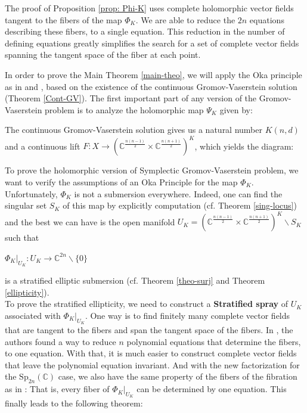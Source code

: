 \documentclass[10pt]{amsart}
\newtheorem{theo}{Theorem}[section]
\theoremstyle{remark}
\begin{document}
The proof of Proposition \ref{prop: Phi-K} uses complete holomorphic vector fields tangent to the fibers of the map $\Phi_K$. We are able to reduce the $2n$ equations describing these fibers, to a single equation. This reduction in the number of defining equations greatly simplifies the search for a set of complete vector fields spanning the tangent space of the fiber at each point. 

\iffalse
In order to prove the Main Theorem \ref{main-theo}, we will apply the Oka principle as in \cite{KI} and \cite{Scho}, based on the existence of the continuous Gromov-Vaserstein solution (Theorem \ref{Cont-GV}). The first important part of any version of the Gromov-Vaserstein problem is to analyze the holomorphic map $\Psi_K$ given by:

The continuous Gromov-Vaserstein solution gives us a natural number $K(n,d)$ and a continuous lift $F: X \to (\mathbb{C}^{\frac{n(n-1)}{2}} \times \mathbb{C}^{\frac{n(n+1)}{2}})^K$, which yields the diagram: 

To prove the holomorphic version of Symplectic Gromov-Vaserstein problem, we want to verify the assumptions of an Oka Principle for the map $\Phi_K$. Unfortunately, $\Phi_K$ is not a submersion everywhere. Indeed, one can find the singular set $S_K$  of this map by explicitly computation (cf. Theorem \ref{sing-locus}) and the best we can have is the open manifold $U_K = (\mathbb{C}^{\frac{n(n-1)}{2}} \times \mathbb{C}^{\frac{n(n+1)}{2}} )^K \backslash S_K$ such that 
\begin{center}
    $\Phi_K|_{U_K}: U_K \to \mathbb{C}^{2n} \backslash \lbrace 0 \rbrace$
\end{center}
is a stratified elliptic submersion (cf. Theorem \ref{theo-surj} and Theorem \ref{ellipticity}).\\


To prove the stratified ellipticity, we need to construct a \textbf{Stratified spray} of $U_K$ associated with $\Phi_K|_{U_K}$. One way is to find finitely many complete vector fields that are tangent to the fibers and span the tangent space of the fibers. In \cite{KI}, the authors found a way to reduce $n$ polynomial equations that determine the fibers, to one equation. With that, it is much easier to construct complete vector fields that leave the polynomial equation invariant. And with the new factorization for the $\mathrm{Sp}_{2n}(\mathbb{C})$ case, we also have the same property of the fibers of the fibration as in \cite{KI}: That is, every fiber of $\Phi_K|_{U_K}$ can be determined by one equation. This finally leads to the following theorem:
\end{document}
